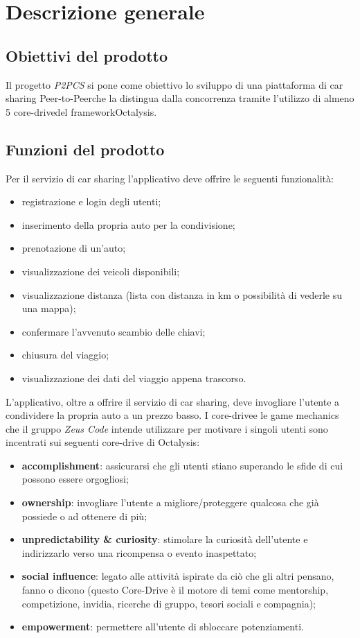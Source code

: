 \section{Descrizione generale} 
\subsection{Obiettivi del prodotto}
Il progetto \textit{P2PCS} si pone come obiettivo lo sviluppo di una piattaforma di car sharing Peer-to-Peer\glosp che la distingua dalla concorrenza tramite l'utilizzo di almeno 5 core-drive\glosp del framework\glosp Octalysis\glo.

\subsection{Funzioni del prodotto}
Per il servizio di car sharing l'applicativo deve offrire le seguenti funzionalità:
\begin{itemize}
	\item registrazione e login degli utenti;
	\item inserimento della propria auto per la condivisione;
	\item prenotazione di un'auto;
	\item visualizzazione dei veicoli disponibili;
	\item visualizzazione distanza (lista con distanza in km o possibilità di vederle su una mappa);
	\item confermare l’avvenuto scambio delle chiavi;
	\item chiusura del viaggio;
	\item visualizzazione dei dati del viaggio appena trascorso.
	\newline
\end{itemize}
L'applicativo, oltre a offrire il servizio di car sharing, deve invogliare l'utente a condividere la propria auto a un prezzo basso. 
I core-drive\glosp e le game mechanics che il gruppo \textit{Zeus Code} intende utilizzare per motivare i singoli utenti sono incentrati sui seguenti core-drive di Octalysis\glo: 
\begin{itemize}
	\item \textbf{accomplishment}: assicurarsi che gli utenti stiano superando le sfide di cui possono essere orgogliosi;
	\item \textbf{ownership}: invogliare l'utente a migliore/proteggere qualcosa che già possiede o ad ottenere di più;
	\item \textbf{unpredictability \& curiosity}: stimolare la curiosità dell'utente e indirizzarlo verso una ricompensa o evento inaspettato;
	\item \textbf{social influence}: legato alle attività ispirate da ciò che gli altri pensano, fanno o dicono (questo Core-Drive è il motore di temi come mentorship, competizione, invidia, ricerche di gruppo, tesori sociali e compagnia);
	\item \textbf{empowerment}: permettere all'utente di sbloccare potenziamenti.
\end{itemize}
